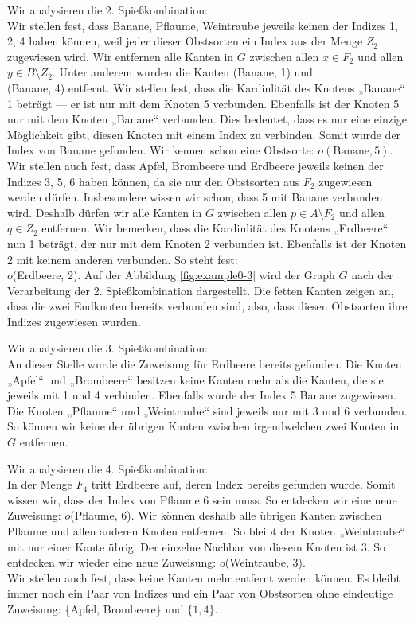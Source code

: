 Wir analysieren die 2. Spießkombination:
.\\
Wir stellen fest, dass Banane, Pflaume, Weintraube jeweils keinen der Indizes 1, 2, 4 haben können,
weil jeder dieser Obstsorten ein Index aus der Menge $Z_2$ zugewiesen wird. 
Wir entfernen alle Kanten in $G$ zwischen allen $x \in F_2$ und allen $y \in B \setminus Z_2$.
Unter anderem wurden die Kanten (Banane, 1) und\\ (Banane, 4) entfernt.
Wir stellen fest, dass die Kardinlität des Knotens „Banane“ 1 beträgt --- er ist nur mit dem Knoten 5 verbunden.
Ebenfalls ist der Knoten 5 nur mit dem Knoten „Banane“ verbunden.
Dies bedeutet, dass es nur eine einzige Möglichkeit gibt, diesen Knoten mit einem Index zu verbinden.
Somit wurde der Index von Banane gefunden. Wir kennen schon eine Obstsorte: $o(\text{Banane}, 5)$.\\
Wir stellen auch fest, dass Apfel, Brombeere und Erdbeere jeweils keinen der Indizes 3, 5, 6 haben können,
da sie nur den Obstsorten aus $F_2$ zugewiesen werden dürfen.
Insbesondere wissen wir schon, dass 5 mit Banane verbunden wird.
Deshalb dürfen wir alle Kanten in $G$ zwischen allen $p \in A \setminus F_2$ und allen $q \in Z_2$ entfernen.
Wir bemerken, dass die Kardinlität des Knotens „Erdbeere“ nun 1 beträgt, der nur mit dem Knoten 2 verbunden ist.
Ebenfalls ist der Knoten 2 mit keinem anderen verbunden. So steht fest:\\ $o$(Erdbeere, 2).
Auf der Abbildung \ref{fig:example0-3} wird der Graph $G$ nach der Verarbeitung der 2. Spießkombination
dargestellt. Die fetten Kanten zeigen an, dass die zwei Endknoten bereits verbunden sind, also, dass 
diesen Obstsorten ihre Indizes zugewiesen wurden.

Wir analysieren die 3. Spießkombination:
.\\
An dieser Stelle wurde die Zuweisung für Erdbeere bereits gefunden.
Die Knoten „Apfel“ und „Brombeere“ besitzen keine Kanten mehr als die Kanten, die sie jeweils mit 1 und 4 verbinden. 
Ebenfalls wurde der Index 5 Banane zugewiesen.
Die Knoten „Pflaume“ und „Weintraube“ sind jeweils nur mit 3 und 6 verbunden.
So können wir keine der übrigen Kanten zwischen irgendwelchen zwei Knoten in $G$ entfernen.

Wir analysieren die 4. Spießkombination:
.\\
In der Menge $F_4$ tritt Erdbeere auf, deren Index bereits gefunden wurde.
Somit wissen wir, dass der Index von Pflaume 6 sein muss. 
So entdecken wir eine neue Zuweisung: $o$(Pflaume, 6).
Wir können deshalb alle übrigen Kanten zwischen Pflaume und allen anderen Knoten entfernen.
So bleibt der Knoten „Weintraube“ mit nur einer Kante übrig.
Der einzelne Nachbar von diesem Knoten ist 3. So entdecken wir wieder eine neue Zuweisung: $o$(Weintraube, 3).\\
Wir stellen auch fest, dass keine Kanten mehr entfernt werden können.
Es bleibt immer noch ein Paar von Indizes und ein Paar von Obstsorten ohne eindeutige Zuweisung:
\{Apfel, Brombeere\} und $\{1, 4\}$.

